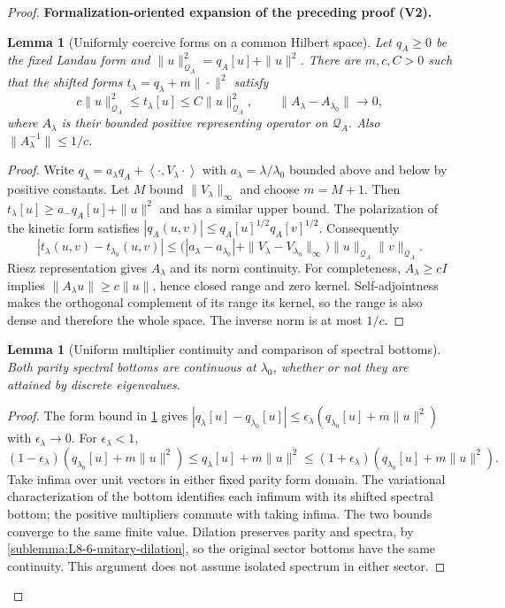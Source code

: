 \documentclass[11pt]{article}
\newtheorem{lemma}[theorem]{Lemma}
\newcommand{\formalisationparentid}{X}
\newenvironment{formalisationaddition}[1]{\par\medskip\begingroup\color{blue}\def\formalisationparentid{#1}\setcounter{formalizationsublemma}{0}\let\lemma\formalizationsublemma\let\endlemma\endformalizationsublemma
  \def\Eo{\mathcal E_h^\circ}\def\EE{\mathcal E_h}\def\phio{\phi_h^\circ}\def\phih{\phi_h}\def\Ho{H_h^{\rm atom}(v^\circ)}\def\Ha{H_h^{\rm atom}}\def\HL{H_h^{L}}\def\Dh{D_h}\def\Log{\operatorname{Log}}\def\ellh{\ell_h}\def\Gp{G_{p,h}}\def\Ast{A_{*,h}}\def\ahat{\widehat{\mathfrak a}_h}\def\ah{\mathfrak a_h}\def\rh{\widehat\rho_h}\def\deltah{\widehat\delta_h}\def\oldref##1{\textup{(##1)}}\def\interface##1{\par\noindent\textit{Analytical interface used here.} ##1\par}\def\finish{\par\noindent\textit{Conclusion of the formalization-oriented expansion.} }\par\noindent\textbf{Formalization-oriented expansion of the preceding proof (V2).}\par\smallskip
}{\par\endgroup\medskip
}
\newcommand{\ip}[2]{\left\langle #1,#2\right\rangle}
\begin{document}
\begin{proof}
\begin{formalisationaddition}{L8.6}
\begin{lemma}[Uniformly coercive forms on a common Hilbert space]\label{sublemma:L8-6-form-operators}
Let $q_A\ge0$ be the fixed Landau form and
$\|u\|_{\mathcal Q_A}^2=q_A[u]+\|u\|^2$.
There are $m,c,C>0$ such that the shifted forms
$t_\lambda=q_\lambda+m\|\cdot\|^2$ satisfy
\[
 c\|u\|_{\mathcal Q_A}^2\le t_\lambda[u]\le
 C\|u\|_{\mathcal Q_A}^2,
 \qquad \|A_\lambda-A_{\lambda_0}\|\to0,
\]
where $A_\lambda$ is their bounded positive representing operator on
$\mathcal Q_A$. Also $\|A_\lambda^{-1}\|\le1/c$.
\end{lemma}
\begin{proof}
Write $q_\lambda=a_\lambda q_A+\ip\cdot{V_\lambda\cdot}$ with
$a_\lambda=\lambda/\lambda_0$ bounded above and below by positive
constants. Let $M$ bound $\|V_\lambda\|_\infty$ and choose $m=M+1$.
Then $t_\lambda[u]\ge a_-q_A[u]+\|u\|^2$ and has a similar upper
bound. The polarization of the kinetic form satisfies
$|q_A(u,v)|\le q_A[u]^{1/2}q_A[v]^{1/2}$.
Consequently
\[
 |t_\lambda(u,v)-t_{\lambda_0}(u,v)|
 \le\bigl(|a_\lambda-a_{\lambda_0}|+
                \|V_\lambda-V_{\lambda_0}\|_\infty\bigr)
      \|u\|_{\mathcal Q_A}\|v\|_{\mathcal Q_A}.
\]
Riesz representation gives $A_\lambda$ and its norm continuity.
For completeness, $A_\lambda\ge cI$ implies
$\|A_\lambda u\|\ge c\|u\|$, hence closed range and zero kernel.
Self-adjointness makes the orthogonal complement of its range its
kernel, so the range is also dense and therefore the whole space.
The inverse norm is at most $1/c$.
\end{proof}

\begin{lemma}[Uniform multiplier continuity and comparison of spectral bottoms]\label{sublemma:L8-6-form-bottoms}
Both parity spectral bottoms are continuous at $\lambda_0$, whether or
not they are attained by discrete eigenvalues.
\end{lemma}
\begin{proof}
The form bound in \ref{sublemma:L8-6-form-operators} gives
$|q_\lambda[u]-q_{\lambda_0}[u]|\le
 \epsilon_\lambda(q_{\lambda_0}[u]+m\|u\|^2)$ with
$\epsilon_\lambda\to0$. For $\epsilon_\lambda<1$,
\[
 (1-\epsilon_\lambda)(q_{\lambda_0}[u]+m\|u\|^2)
 \le q_\lambda[u]+m\|u\|^2
 \le(1+\epsilon_\lambda)(q_{\lambda_0}[u]+m\|u\|^2).
\]
Take infima over unit vectors in either fixed parity form domain.
The variational characterization of the bottom identifies each infimum
with its shifted spectral bottom; the positive multipliers commute
with taking infima. The two bounds converge to the same finite value.
Dilation preserves parity and spectra, by
\ref{sublemma:L8-6-unitary-dilation}, so the original sector bottoms
have the same continuity. This argument does not assume isolated
spectrum in either sector.
\end{proof}


\end{formalisationaddition}
\end{proof}
\end{document}
